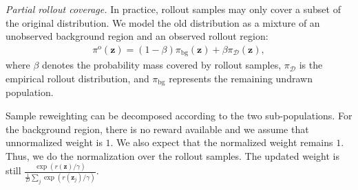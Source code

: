 \documentclass{article} %
\begin{document}
{\color{gray}
\emph{Partial rollout coverage.}
In practice, rollout samples may only cover a subset of the original 
distribution. 
We model the old distribution as a mixture of an unobserved
background region and an observed rollout region:
\begin{align}
\pi^{\mathrm{o}}(\mathbf z)
=
(1-\beta)
\pi_{\mathrm{bg}}(\mathbf z)
+
\beta
\pi_{\mathcal D}(\mathbf z),
\end{align}
where $\beta$ denotes the probability mass covered by rollout samples,
$\pi_{\mathcal D}$ is the empirical rollout distribution, and
$\pi_{\mathrm{bg}}$ represents the remaining undrawn population.

Sample reweighting can be decomposed according to the two
sub-populations.
For the background region, 
there is no reward available
and
we assume that unnormalized weight is $1$.
We also expect that
the normalized weight
remains $1$.
Thus, we do the normalization 
over the rollout samples.
The updated weight is still
$\frac{
\exp(r(\mathbf z)/\gamma)
}
{
\frac{1}{D}
\sum_j
\exp(r(\mathbf z_j)/\gamma)
}$.
}

\end{document}
